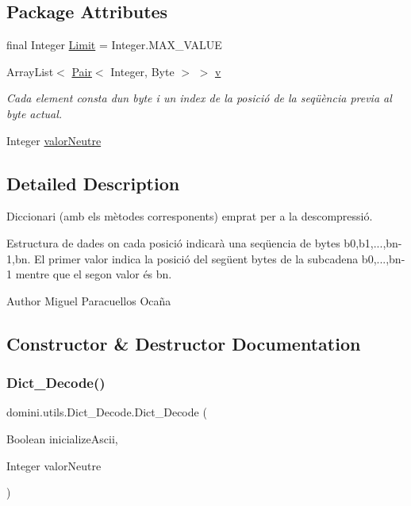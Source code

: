 \subsection*{Package Attributes}
\begin{DoxyCompactItemize}
\item 
final Integer \hyperlink{classdomini_1_1utils_1_1Dict__Decode_a10fd6693de70b9091942496b35324c5a}{Limit} = Integer.\+M\+A\+X\+\_\+\+V\+A\+L\+UE
\item 
Array\+List$<$ \hyperlink{classdomini_1_1utils_1_1Pair}{Pair}$<$ Integer, Byte $>$ $>$ \hyperlink{classdomini_1_1utils_1_1Dict__Decode_a351bb8836b391e5e21ebc9cc1943a22d}{v}
\begin{DoxyCompactList}\small\item\em Cada element consta d\textquotesingle{}un byte i un index de la posició de la seqüència previa al byte actual. \end{DoxyCompactList}\item 
Integer \hyperlink{classdomini_1_1utils_1_1Dict__Decode_a6ef2d17f449cf7a658a4bf983e2fb474}{valor\+Neutre}
\end{DoxyCompactItemize}


\subsection{Detailed Description}
Diccionari (amb els mètodes corresponents) emprat per a la descompressió. 

Estructura de dades on cada posició indicarà una seqüencia de bytes b0,b1,...,bn-\/1,bn. El primer valor indica la posició del següent bytes de la subcadena b0,...,bn-\/1 mentre que el segon valor és bn. \begin{DoxyAuthor}{Author}
Miguel Paracuellos Ocaña 
\end{DoxyAuthor}


\subsection{Constructor \& Destructor Documentation}
\mbox{\label{classdomini_1_1utils_1_1Dict__Decode_a8a0f9e67c530bafc031e72c218ce74f8}} 
\subsubsection{\texorpdfstring{Dict\+\_\+\+Decode()}{Dict\_Decode()}}
{\footnotesize\ttfamily domini.\+utils.\+Dict\+\_\+\+Decode.\+Dict\+\_\+\+Decode (\begin{DoxyParamCaption}\item[{Boolean}]{inicialize\+Ascii,  }\item[{Integer}]{valor\+Neutre }\end{DoxyParamCaption})\hspace{0.3cm}{\ttfamily [inline]}}



